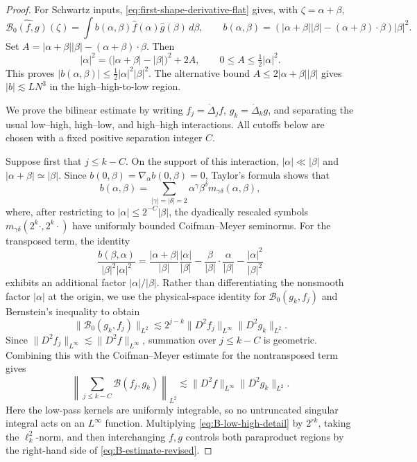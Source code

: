 \documentclass[12pt]{amsart}
\theoremstyle{remark}
\theoremstyle{definition}
\numberwithin{equation}{section}
\begin{document}
\begin{proof}
For Schwartz inputs, \eqref{eq:first-shape-derivative-flat} gives, with
\(\zeta=\alpha+\beta\),
\[
 \widehat{\mathcal B_0(f,g)}(\zeta)
 =\int b(\alpha,\beta)\widehat f(\alpha)\widehat g(\beta)\,d\beta,
 \qquad
 b(\alpha,\beta)
 =\left(|\alpha+\beta||\beta|-(\alpha+\beta)\cdot\beta\right)|\beta|^2.
\]
Set
\(A=|\alpha+\beta||\beta|-(\alpha+\beta)\cdot\beta\).  Then
\[
 |\alpha|^2
 =\bigl(|\alpha+\beta|-|\beta|\bigr)^2+2A,
 \qquad 0\leq A\leq\tfrac12|\alpha|^2.
\]
This proves \(|b(\alpha,\beta)|\leq\frac12|\alpha|^2|\beta|^2\).
The alternative bound \(A\leq2|\alpha+\beta||\beta|\) gives
\(|b|\lesssim LN^3\) in the high--high-to-low region.

We prove the bilinear estimate by writing
\(f_j=\dot\Delta_jf\), \(g_k=\dot\Delta_kg\), and separating the usual
low--high, high--low, and high--high interactions.  All cutoffs below are
chosen with a fixed positive separation integer \(C\).

Suppose first that \(j\leq k-C\).  On the support of this interaction,
\(|\alpha|\ll|\beta|\) and \(|\alpha+\beta|\simeq|\beta|\).  Since
\(b(0,\beta)=\nabla_\alpha b(0,\beta)=0\), Taylor's formula shows that
\[
 b(\alpha,\beta)
 =\sum_{|\gamma|=|\delta|=2}
  \alpha^\gamma\beta^\delta m_{\gamma\delta}(\alpha,\beta),
\]
where, after restricting to \(|\alpha|\leq2^{-C}|\beta|\), the dyadically
rescaled symbols \(m_{\gamma\delta}(2^k\cdot,2^k\cdot)\) have uniformly
bounded Coifman--Meyer seminorms.  For the transposed term, the identity
\[
 \frac{b(\beta,\alpha)}{|\beta|^2|\alpha|^2}
 =\frac{|\alpha+\beta|}{|\beta|}\frac{|\alpha|}{|\beta|}
  -\frac{\beta}{|\beta|}\cdot\frac{\alpha}{|\beta|}
  -\frac{|\alpha|^2}{|\beta|^2}
\]
exhibits an additional factor \(|\alpha|/|\beta|\).  Rather than
differentiating the nonsmooth factor \(|\alpha|\) at the origin, we use the
physical-space identity for \(\mathcal B_0(g_k,f_j)\) and Bernstein's
inequality to obtain
\[
 \|\mathcal B_0(g_k,f_j)\|_{L^2}
 \lesssim 2^{j-k}\|D^2f_j\|_{L^\infty}\|D^2g_k\|_{L^2}.
\]
Since \(\|D^2f_j\|_{L^\infty}\lesssim\|D^2f\|_{L^\infty}\), summation
over \(j\leq k-C\) is geometric.  Combining this with the
Coifman--Meyer estimate for the nontransposed term gives
\begin{equation}
\label{eq:B-low-high-detail}
 \left\|\sum_{j\leq k-C}\mathcal B(f_j,g_k)\right\|_{L^2}
 \lesssim \|D^2f\|_{L^\infty}\|D^2g_k\|_{L^2}.
\end{equation}
Here the low-pass kernels are uniformly integrable, so no untruncated singular integral acts on an \(L^\infty\) function.  
Multiplying \eqref{eq:B-low-high-detail} by \(2^{rk}\), taking the \(\ell^2_k\)-norm, and then interchanging \(f,g\) controls both paraproduct regions by the right-hand side of \eqref{eq:B-estimate-revised}.


\end{proof}
\end{document}
